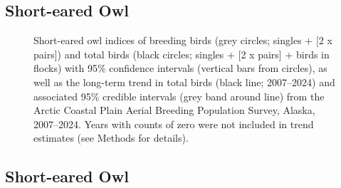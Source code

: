\documentclass[
]{article}
\begin{document}
\newpage{}

\subsection*{Short-eared Owl}\label{short-eared-owl}

\begin{figure}


\caption{\label{fig-SEOW}Short-eared owl indices of breeding birds (grey
circles; singles + {[}2 x pairs{]}) and total birds (black circles;
singles + {[}2 x pairs{]} + birds in flocks) with 95\% confidence
intervals (vertical bars from circles), as well as the long-term trend
in total birds (black line; 2007--2024) and associated 95\% credible
intervals (grey band around line) from the Arctic Coastal Plain Aerial
Breeding Population Survey, Alaska, 2007--2024. Years with counts of
zero were not included in trend estimates (see Methods for details).}

\end{figure}%

\newpage{}

\subsection*{Short-eared Owl}\label{short-eared-owl-1}

\begingroup\fontsize{10}{12}\selectfont
\end{document}
